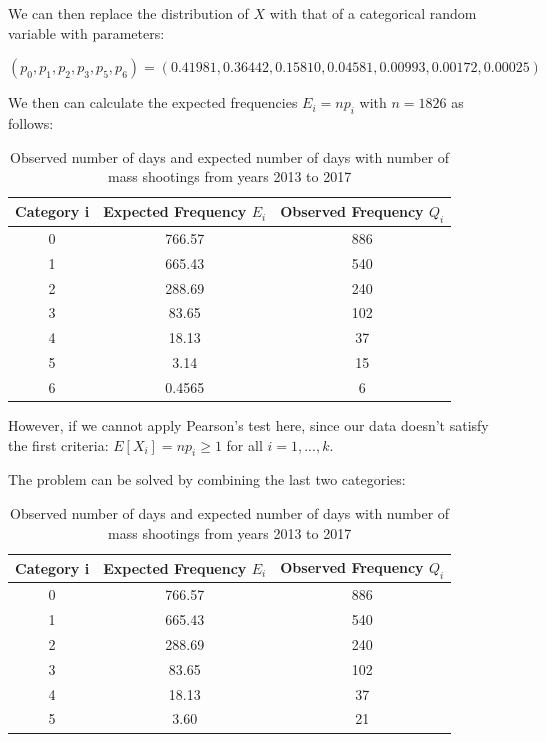 \documentclass[12pt]{article}
\begin{document}
\par We can then replace the distribution of $X$ with that of a categorical random variable with parameters:
\begin{center}
$(p_0,p_1,p_2,p_3,p_5,p_6)=(0.41981,0.36442,0.15810,0.04581,0.00993,0.00172,0.00025)$
\end{center}
\par We then can calculate the expected frequencies $E_i=np_i$ with $n=1826$ as follows:
\begin{table} [!htbp]
\begin{center}
\begin{tabular*} {14cm} {@{\extracolsep{\fill} }ccc}
\toprule
Category i & Expected Frequency $E_i$ & Observed Frequency $Q_i$ \\
\midrule
0 & 766.57 & 886\\ \hline
1 & 665.43 & 540\\ \hline
2 & 288.69 & 240\\ \hline
3 & 83.65  & 102\\ \hline
4 & 18.13  &  37\\ \hline
5 & 3.14   &  15\\ \hline
6 & 0.4565 &  6 \\
\bottomrule
\end{tabular*}
\end{center}
\caption{Observed number of days and expected number of days with number of mass shootings from years 2013 to 2017}
\end{table}
\par However, if we cannot apply Pearson's test here, since our data doesn't satisfy the first criteria: $E[X_i]=np_i\geq1$ for all $i=1,...,k$.
\par The problem can be solved by combining the last two categories:
\begin{table} [!htbp]
\begin{center}
\begin{tabular*} {14cm} {@{\extracolsep{\fill} }ccc}
\toprule
Category i & Expected Frequency $E_i$ & Observed Frequency $Q_i$ \\
\midrule
0 & 766.57 & 886\\ \hline
1 & 665.43 & 540\\ \hline
2 & 288.69 & 240\\ \hline
3 & 83.65  & 102\\ \hline
4 & 18.13  &  37\\ \hline
5 & 3.60   &  21\\
\bottomrule
\end{tabular*}
\end{center}
\caption{Observed number of days and expected number of days with number of mass shootings from years 2013 to 2017}
\end{table}
\end{document}
